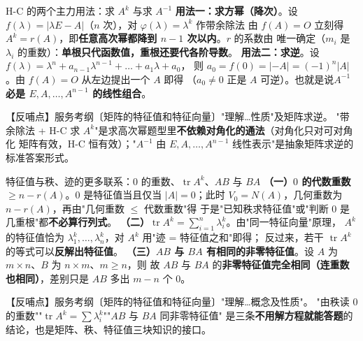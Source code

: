 \begin{fdeep}{H-C 的两个主力用法：求 $A^{k}$ 与求 $A^{-1}$}
\textbf{用法一：求方幂（降次）}。设 $f(\lambda)=\lvert\lambda E-A\rvert$（$n$ 次），对 $\varphi(\lambda)=\lambda^{k}$
作带余除法
由 $f(A)=O$ 立刻得 $A^{k}=r(A)$，即\textbf{任意高次幂都降到 $n-1$ 次以内}。$r$ 的系数由
唯一确定（$m_i$ 是 $\lambda_i$ 的重数）：\textbf{单根只代函数值，重根还要代各阶导数}。
\textbf{用法二：求逆}。设 $f(\lambda)=\lambda^{n}+a_{n-1}\lambda^{n-1}+\dots+a_1\lambda+a_0$，
则 $a_0=f(0)=\lvert-A\rvert=(-1)^{n}\lvert A\rvert$。由 $f(A)=O$ 从左边提出一个 $A$ 即得
（$a_0\ne0$ 正是 $A$ 可逆）。也就是说\textbf{$A^{-1}$ 必是 $E,A,\dots,A^{n-1}$ 的线性组合}。

【反哺点】服务考纲〔矩阵的特征值和特征向量〕"理解…性质"及矩阵求逆。
"带余除法 + H-C 求 $A^{k}$"是求高次幂题型里\textbf{不依赖对角化的通法}（对角化只对可对角化
矩阵有效，H-C 恒有效）；"$A^{-1}$ 由 $E,A,\dots,A^{n-1}$ 线性表示"是抽象矩阵求逆的标准答案形式。
\end{fdeep}

\begin{fdeep}{特征值与秩、迹的更多联系：$0$ 的重数、$\operatorname{tr}A^{k}$、$AB$ 与 $BA$}
\textbf{（一）$0$ 的代数重数 $\ge n-r(A)$}。$0$ 是特征值当且仅当 $\lvert A\rvert=0$；此时
$V_0=N(A)$，几何重数为 $n-r(A)$，再由"几何重数 $\le$ 代数重数"得
于是"已知秩求特征值"或"判断 $0$ 是几重根"都\textbf{不必算行列式}。
\textbf{（二）$\operatorname{tr}A^{k}=\sum_{i=1}^{n}\lambda_i^{k}$}。由"同一特征向量"原理，
$A^{k}$ 的特征值恰为 $\lambda_1^{k},\dots,\lambda_n^{k}$，对 $A^{k}$ 用"迹 = 特征值之和"即得；
反过来，若干 $\operatorname{tr}A^{k}$ 的等式可以\textbf{反解出特征值}。
\textbf{（三）$AB$ 与 $BA$ 有相同的非零特征值}。设 $A$ 为 $m\times n$、$B$ 为 $n\times m$、$m\ge n$，则
故 $AB$ 与 $BA$ 的\textbf{非零特征值完全相同（连重数也相同）}，差别只是 $AB$ 多出 $m-n$ 个 $0$。

【反哺点】服务考纲〔矩阵的特征值和特征向量〕"理解…概念及性质"。
"由秩读 $0$ 的重数""$\operatorname{tr}A^{k}=\sum\lambda_i^{k}$""$AB$ 与 $BA$ 同非零特征值"
是三条\textbf{不用解方程就能答题}的结论，也是矩阵、秩、特征值三块知识的接口。
\end{fdeep}

